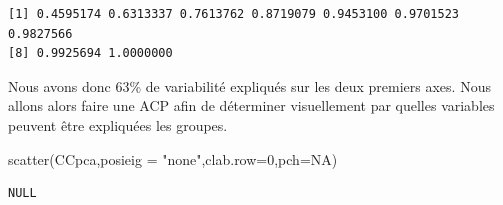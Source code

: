 \documentclass[
]{article}
\newenvironment{Shaded}{}{}
\newcommand{\AttributeTok}[1]{#1}
\newcommand{\CommentTok}[1]{\textcolor[rgb]{0.00,0.50,0.00}{#1}}
\newcommand{\ConstantTok}[1]{#1}
\newcommand{\DecValTok}[1]{#1}
\newcommand{\FunctionTok}[1]{#1}
\newcommand{\NormalTok}[1]{#1}
\newcommand{\OtherTok}[1]{\textcolor[rgb]{1.00,0.25,0.00}{#1}}
\newcommand{\SpecialCharTok}[1]{\textcolor[rgb]{0.00,0.50,0.50}{#1}}
\newcommand{\StringTok}[1]{\textcolor[rgb]{0.00,0.50,0.50}{#1}}
\begin{document}
\begin{Shaded}
\end{Shaded}

\begin{verbatim}
[1] 0.4595174 0.6313337 0.7613762 0.8719079 0.9453100 0.9701523 0.9827566
[8] 0.9925694 1.0000000
\end{verbatim}

Nous avons donc 63\% de variabilité expliqués sur les deux premiers
axes. Nous allons alors faire une ACP afin de déterminer visuellement
par quelles variables peuvent être expliquées les groupes.

\begin{Shaded}
\begin{Highlighting}[]
\FunctionTok{scatter}\NormalTok{(CCpca,}\AttributeTok{posieig =} \StringTok{"none"}\NormalTok{,}\AttributeTok{clab.row=}\DecValTok{0}\NormalTok{,}\AttributeTok{pch=}\ConstantTok{NA}\NormalTok{)}
\end{Highlighting}
\end{Shaded}

\begin{verbatim}
NULL
\end{verbatim}

\begin{Shaded}
\end{Shaded}
\end{document}
